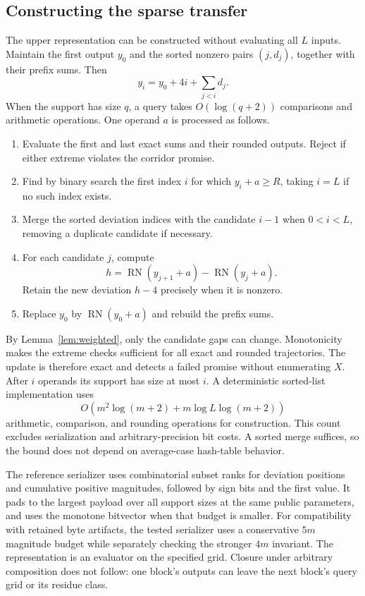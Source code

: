 \documentclass[11pt,reqno]{amsart}
\theoremstyle{definition}
\theoremstyle{remark}
\numberwithin{equation}{section}
\DeclareMathOperator{\RN}{RN}
\begin{document}
\subsection{Constructing the sparse transfer}
\label{subsec:sparse-construction}

The upper representation can be constructed without evaluating all
$L$ inputs. Maintain the first output $y_0$ and the sorted nonzero
pairs $(j,d_j)$, together with their prefix sums. Then
\begin{equation}
\label{eq:sparse-recovery}
 y_i=y_0+4i+\sum_{j<i}d_j.
\end{equation}
When the support has size $q$, a query takes $O(\log(q+2))$ comparisons
and arithmetic operations. One operand $a$ is processed as follows.
\begin{enumerate}
 \item Evaluate the first and last exact sums and their rounded
       outputs. Reject if either extreme violates the corridor promise.
 \item Find by binary search the first index $i$ for which
       $y_i+a\geq R$, taking $i=L$ if no such index exists.
 \item Merge the sorted deviation indices with the candidate $i-1$
       when $0<i<L$, removing a duplicate candidate if necessary.
 \item For each candidate $j$, compute
       \[
         h=\RN(y_{j+1}+a)-\RN(y_j+a).
       \]
       Retain the new deviation $h-4$ precisely when it is nonzero.
 \item Replace $y_0$ by $\RN(y_0+a)$ and rebuild the prefix sums.
\end{enumerate}

By Lemma~\ref{lem:weighted}, only the candidate gaps can change.
Monotonicity makes the extreme checks sufficient for all exact and
rounded trajectories. The update is therefore exact and detects a
failed promise without enumerating $X$. After $i$ operands its support
has size at most $i$. A deterministic sorted-list implementation uses
\begin{equation}
\label{eq:construction-cost}
 O\!\left(m^2\log(m+2)+m\log L\log(m+2)\right)
\end{equation}
arithmetic, comparison, and rounding operations for construction.
This count excludes serialization and arbitrary-precision bit costs.
A sorted merge suffices, so the bound does not depend on average-case
hash-table behavior.

The reference serializer uses combinatorial subset ranks for deviation
positions and cumulative positive magnitudes, followed by sign bits
and the first value. It pads to the largest payload over all support
sizes at the same public parameters, and uses the monotone bitvector
when that budget is smaller. For compatibility with retained byte
artifacts, the tested serializer uses a conservative $5m$ magnitude
budget while separately checking the stronger $4m$ invariant.
The representation is an evaluator on the specified grid. Closure
under arbitrary composition does not follow: one block's outputs can
leave the next block's query grid or its residue class.
\end{document}
